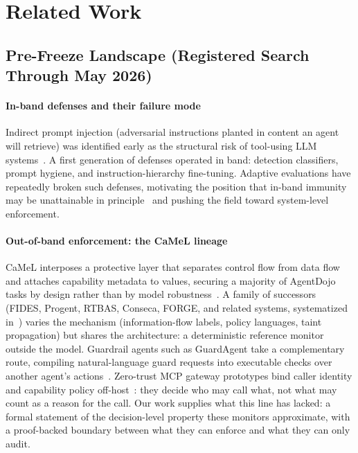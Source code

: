 \documentclass[conference]{IEEEtran}
\begin{document}
\section{Related Work}
\label{sec:related}

\subsection{Pre-Freeze Landscape (Registered Search Through May 2026)}

\paragraph{In-band defenses and their failure mode}
Indirect prompt injection (adversarial instructions planted in
content an agent will retrieve) was identified early as the
structural risk of tool-using LLM systems~\cite{greshake}. A first
generation of defenses operated in band: detection classifiers,
prompt hygiene, and instruction-hierarchy fine-tuning. Adaptive
evaluations have repeatedly broken such defenses, motivating the
position that in-band immunity may be unattainable in
principle~\cite{abdelnabi} and pushing the field toward
system-level enforcement.

\paragraph{Out-of-band enforcement: the CaMeL lineage}
CaMeL interposes a protective layer that separates control flow
from data flow and attaches capability metadata to values,
securing a majority of AgentDojo tasks by design rather than by
model robustness~\cite{camel}. A family of successors (FIDES,
Progent, RTBAS, Conseca, FORGE, and related systems, systematized
in~\cite{oob}) varies the mechanism (information-flow labels,
policy languages, taint propagation) but shares the architecture:
a deterministic reference monitor outside the model. Guardrail
agents such as GuardAgent take a complementary route, compiling
natural-language guard requests into executable checks over
another agent's actions~\cite{guardagent}. Zero-trust MCP gateway prototypes bind caller identity and
capability policy off-host~\cite{ztmcp,kodathala2026aiauthz}:
they decide who may call what, not what may count as a reason for
the call. Our work supplies what
this line has lacked: a formal statement of the decision-level
property these monitors approximate, with a proof-backed boundary
between what they can enforce and what they can only audit.
\end{document}
